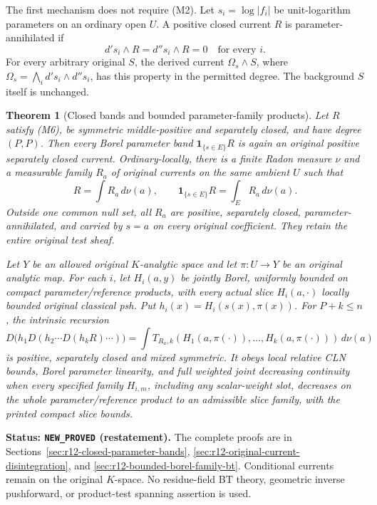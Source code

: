 \documentclass[11pt,a4paper]{article}
\numberwithin{equation}{section}
\newtheorem{theorem}{Theorem}[section]
\theoremstyle{definition}
\theoremstyle{remark}
\begin{document}
The first mechanism does not require (M2). Let $s_i=\log|f_i|$
be unit-logarithm parameters on an ordinary open $U$. A positive
closed current $R$ is parameter-annihilated if
\[
                   d's_i\wedge R=d''s_i\wedge R=0
                   \quad\text{for every }i.
 \tag{M6}
\]
For every arbitrary original $S$, the derived current
$\Omega_s\wedge S$, where
$\Omega_s=\bigwedge_i d's_i\wedge d''s_i$, has this property
in the permitted degree. The background $S$ itself is unchanged.

\begin{theorem}[Closed bands and bounded parameter-family products]
\label{thm:r12-main-bands}
Let $R$ satisfy (M6), be symmetric middle-positive and separately
closed, and have degree $(P,P)$. Then every Borel parameter band
$\mathbf1_{\{s\in E\}}R$ is again an original positive separately
closed current. Ordinary-locally, there is a finite Radon measure
$\nu$ and a measurable family $R_a$ of original currents on the
same ambient $U$ such that
\[
 R=\int R_a\,d\nu(a),\qquad
 \mathbf1_{\{s\in E\}}R=\int_E R_a\,d\nu(a).
 \tag{M7}
\]
Outside one common null set, all $R_a$ are positive, separately
closed, parameter-annihilated, and carried by $s=a$ on every
original coefficient. They retain the entire original test sheaf.

Let $Y$ be an allowed original $K$-analytic space and let
$\pi:U\to Y$ be an original analytic map. For each $i$, let
$H_i(a,y)$ be jointly Borel, uniformly bounded on compact
parameter/reference products, with every actual slice $H_i(a,\cdot)$
locally bounded original classical psh. Put
$h_i(x)=H_i(s(x),\pi(x))$. For $P+k\leq n$, the intrinsic recursion
\[
 D\bigl(h_1D(h_2\cdots D(h_kR)\cdots)\bigr)
       =\int T_{R_a,k}(H_1(a,\pi(\cdot)),\ldots,H_k(a,\pi(\cdot)))
                                                        \,d\nu(a)
 \tag{M8}
\]
is positive, separately closed and mixed symmetric. It obeys local
relative CLN bounds, Borel parameter linearity, and full weighted
joint decreasing continuity when every specified family
$H_{i,m}$, including any scalar-weight slot, decreases on the
whole parameter/reference product to an admissible slice family,
with the printed compact slice bounds.
\end{theorem}

\noindent\textbf{Status: \texttt{NEW\_PROVED} (restatement).}
The complete proofs are in
Sections~\ref{sec:r12-closed-parameter-bands},
\ref{sec:r12-original-current-disintegration}, and
\ref{sec:r12-bounded-borel-family-bt}.
Conditional currents remain on the original $K$-space. No
residue-field BT theory, geometric inverse pushforward, or
product-test spanning assertion is used.
\end{document}
